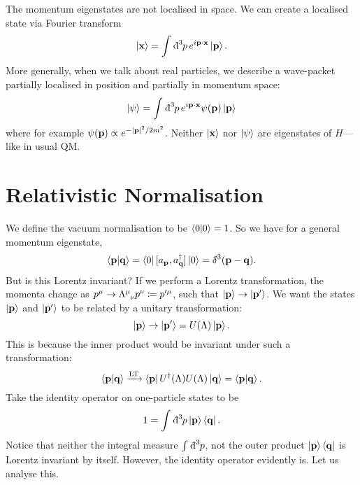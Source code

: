 \begin{leftbar}
  \begin{remark}
    The momentum eigenstates are not localised in space. We can create a localised state via Fourier transform
    \begin{equation}
      \ket{\vb{x}} = \int_{}^{} \bdd[3]{p} e^{i\vb{p}\cdot\vb{x}} \ket{\vb{p}}.
    \end{equation}
    More generally, when we talk about real particles, we describe a wave-packet partially localised in position and partially in momentum space:
    \begin{equation}
      \ket{\psi} = \int_{}^{} \bdd[3]{p} e^{i\vb{p}\cdot\vb{x}} \psi(\vb{p}) \ket{\vb{p}}
    \end{equation}
    where for example $\psi (\vb{p}) \propto e^{- \abs{\vb{p}}^2 / 2m^2}$.
    Neither $\ket{\vb{x}}$ nor $\ket{\psi}$ are eigenstates of $H$---like in usual QM.
  \end{remark}
\end{leftbar}

\section{Relativistic Normalisation}%
\label{sec:relativistic_normalisation}

We define the vacuum normalisation to be $\bra{0}\ket{0} = 1$. So we have for a general momentum eigenstate, 
\begin{equation}
  \bra{\vb{p}} \ket{\vb{q}} = \bra{0} [a_{\vb{p}}, a^{\dagger}_{\vb{q}}] \ket{0} = \bdelta^3 (\vb{p} - \vb{q}).
\end{equation}
But is this Lorentz invariant? If we perform a Lorentz transformation, the momenta change as $p^\mu \to \Lambda\indices{^\mu_\nu} p^\nu \coloneq p'^\mu$, such that $\ket{\vb{p}} \to \ket{\vb{p}'}$.
We want the states $\ket{\vb{p}}$ and $\ket{\vb{p}'}$ to be related by a unitary transformation:
\begin{equation}
  \ket{\vb{p}} \to \ket{\vb{p}'} = U(\Lambda) \ket{\vb{p}}.
\end{equation}
This is because the inner product would be invariant under such a transformation:
\begin{equation}
  \bra{\vb{p}} \ket{\vb{q}} \xrightarrow{\text{LT}} \bra{\vb{p}} U^{\dagger}(\Lambda) U(\Lambda) \ket{\vb{q}} = \bra{\vb{p}} \ket{\vb{q}}.
\end{equation}
Take the identity operator on one-particle states to be
\begin{equation}
  1 = \int_{}^{} \bdd[3]{p} \ket{\vb{p}} \bra{\vb{q}}.
\end{equation}
Notice that neither the integral measure $\int_{}^{} \bdd[3]{p} $, not the outer product $\ket{\vb{p}} \bra{\vb{q}}$ is Lorentz invariant by itself. However, the identity operator evidently is. Let us analyse this.


